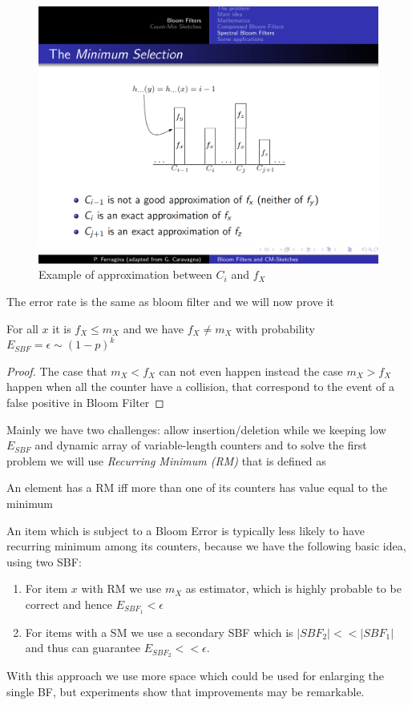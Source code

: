     \begin{figure}
	\caption{Example of approximation between $C_i$ and $f_X$}
	\label{img:approximation}
	\includegraphics[width=\textwidth]{Images/approximation}
    \end{figure}

    The error rate is the same as bloom filter and we will now prove it 
    \begin{thm}
	For all $x$ it is $f_X \leq m_X$ and we have $f_X \neq m_X$ with probability $E_{SBF} = \epsilon \sim (1-p)^k$
    \end{thm}
    \begin{proof}
	The case that $m_X < f_X$ can not even happen instead the case $m_X > f_X$ happen when all the counter have a collision, that correspond to the event of a false positive in Bloom Filter
    \end{proof}
    Mainly we have two challenges: allow insertion/deletion while we keeping low $E_{SBF}$ and dynamic array of variable-length counters and to solve the first problem we will use \emph{Recurring Minimum (RM)} that is defined as 
    \begin{defi}
	An element has a RM iff more than one of its counters has value equal to the minimum
    \end{defi}
    An item which is subject to a Bloom Error is typically less likely to have recurring minimum among its counters, because we have the following basic idea, using two SBF:
    \begin{enumerate}
	\item For item $x$ with RM we use $m_X$ as estimator, which is highly probable to be correct and hence $E_{SBF_1} < \epsilon$
	\item For items with a SM we use a secondary SBF which is $|SBF_2| << |SBF_1|$ and thus can guarantee $E_{SBF_2} << \epsilon$.
    \end{enumerate}
    With this approach we use more space which could be used for enlarging the single BF, but experiments show that improvements may be remarkable.

